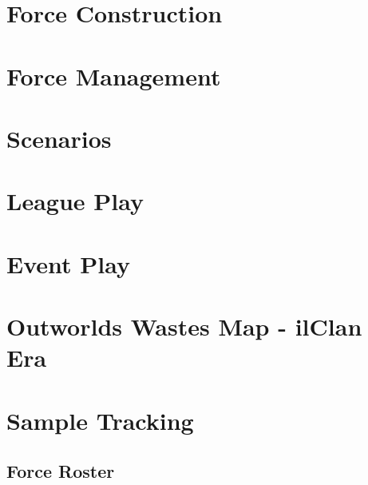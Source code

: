 \documentclass{article}
\newcommand{\mysectiontitle}{}
\newcommand{\newsection}[2]{\renewcommand{\mysectiontitle}{#2}\section{#1}}
\begin{document}


\newsection{Force Construction}{force-construction}



\newpage

\newsection{Force Management}{force-management}



\newpage

\newsection{Scenarios}{scenarios}



\newpage

\newsection{League Play}{league-play}



\newpage

\newsection{Event Play}{event-play}



\newpage

\newsection{Outworlds Wastes Map - ilClan Era}{outworlds-wastes-map}



\newpage

\newsection{Sample Tracking}{sample-tracking}

\subsection{Force Roster}
\end{document}

